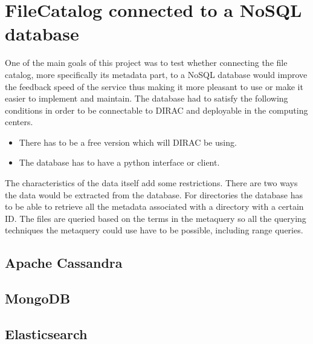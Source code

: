 \chapter{FileCatalog connected to a NoSQL database}
One of the main goals of this project was to test whether connecting the 
file catalog, more specifically its metadata part, to a NoSQL database would 
improve the feedback speed of the service thus making it more pleasant to use
or make it easier to implement and maintain. The database had to satisfy the
following conditions in order to be connectable to DIRAC and deployable in
the computing centers.

\begin{itemize}
\item There has to be a free version which will DIRAC be using.
\item The database has to have a python interface or client.
\end{itemize}

The characteristics of the data itself add some restrictions. There are two
ways the data would be extracted from the database. For directories 
the database has to be able to retrieve all the metadata associated with a directory
with a certain ID. The files are queried based on the terms in the metaquery so
all the querying techniques the metaquery could use have to be possible, including
range queries. 

\section{Apache Cassandra}


\section{MongoDB}

\section{Elasticsearch}

